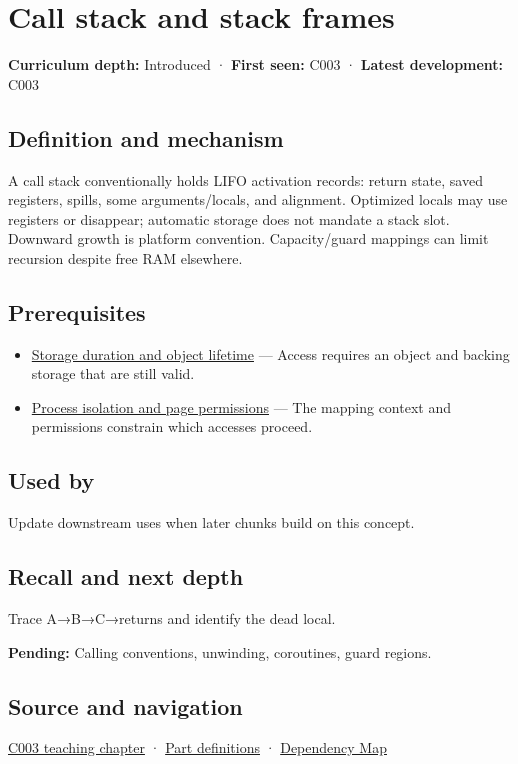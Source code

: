 \hypertarget{appendix-b081b7abe193}{}\label{referencestart:appendix-b081b7abe193}
\section{Call stack and stack frames}\label{appendix-b081b7abe193-call-stack-and-stack-frames}

\textbf{Curriculum depth:} Introduced · \textbf{First seen:} C003 · \textbf{Latest development:} C003

\subsection{Definition and mechanism}\label{appendix-b081b7abe193-definition-and-mechanism}

A call stack conventionally holds LIFO activation records: return state, saved registers, spills, some arguments/locals, and alignment. Optimized locals may use registers or disappear; automatic storage does not mandate a stack slot. Downward growth is platform convention. Capacity/guard mappings can limit recursion despite free RAM elsewhere.

\subsection{Prerequisites}\label{appendix-b081b7abe193-prerequisites}

\begin{itemize}
\tightlist
\item
  \hyperref[appendix-0b104bcba06b]{Storage duration and object lifetime} --- Access requires an object and backing storage that are still valid.
\item
  \hyperref[appendix-c2a9ad1e2b49]{Process isolation and page permissions} --- The mapping context and permissions constrain which accesses proceed.
\end{itemize}

\subsection{Used by}\label{appendix-b081b7abe193-used-by}

Update downstream uses when later chunks build on this concept.

\subsection{Recall and next depth}\label{appendix-b081b7abe193-recall-and-next-depth}

Trace A→B→C→returns and identify the dead local.

\textbf{Pending:} Calling conventions, unwinding, coroutines, guard regions.

\subsection{Source and navigation}\label{appendix-b081b7abe193-source-and-navigation}

\hyperref[01-foundations-i-ch002-where-the-bytes-live]{C003 teaching chapter} · \hyperref[appendix-fd090d982a15-m003---parts-41-60]{Part definitions} · \hyperref[appendix-4ad47bdd269a]{Dependency Map}
